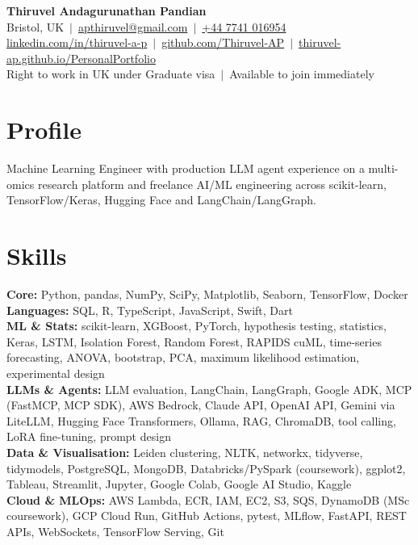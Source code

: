 \documentclass[a4paper,11pt]{article}
\begin{document}
\fontsize{11}{13.2}\selectfont

\begin{center}
  {\LARGE\bfseries Thiruvel Andagurunathan Pandian}\\[3pt]
  Bristol, UK \,$|$\, \href{mailto:apthiruvel@gmail.com}{apthiruvel@gmail.com} \,$|$\, \href{tel:+447741016954}{+44 7741 016954}\\[1pt]
\href{https://www.linkedin.com/in/thiruvel-a-p/}{linkedin.com/in/thiruvel-a-p} \,$|$\, \href{https://github.com/Thiruvel-AP}{github.com/Thiruvel-AP} \,$|$\, \href{https://thiruvel-ap.github.io/PersonalPortfolio/}{thiruvel-ap.github.io/PersonalPortfolio}\\[1pt]
  Right to work in UK under Graduate visa \,$|$\, Available to join immediately
\end{center}

\section{Profile}
Machine Learning Engineer with production LLM agent experience on a multi-omics research platform and freelance AI/ML engineering across scikit-learn, TensorFlow/Keras, Hugging Face and LangChain/LangGraph.

\section{Skills}
\textbf{Core:} Python, pandas, NumPy, SciPy, Matplotlib, Seaborn, TensorFlow, Docker\\[2pt]
\textbf{Languages:} SQL, R, TypeScript, JavaScript, Swift, Dart\\[2pt]
\textbf{ML \& Stats:} scikit-learn, XGBoost, PyTorch, hypothesis testing, statistics, Keras, LSTM, Isolation Forest, Random Forest, RAPIDS cuML, time-series forecasting, ANOVA, bootstrap, PCA, maximum likelihood estimation, experimental design\\[2pt]
\textbf{LLMs \& Agents:} LLM evaluation, LangChain, LangGraph, Google ADK, MCP (FastMCP, MCP SDK), AWS Bedrock, Claude API, OpenAI API, Gemini via LiteLLM, Hugging Face Transformers, Ollama, RAG, ChromaDB, tool calling, LoRA fine-tuning, prompt design\\[2pt]
\textbf{Data \& Visualisation:} Leiden clustering, NLTK, networkx, tidyverse, tidymodels, PostgreSQL, MongoDB, Databricks/PySpark (coursework), ggplot2, Tableau, Streamlit, Jupyter, Google Colab, Google AI Studio, Kaggle\\[2pt]
\textbf{Cloud \& MLOps:} AWS Lambda, ECR, IAM, EC2, S3, SQS, DynamoDB (MSc coursework), GCP Cloud Run, GitHub Actions, pytest, MLflow, FastAPI, REST APIs, WebSockets, TensorFlow Serving, Git
\end{document}
